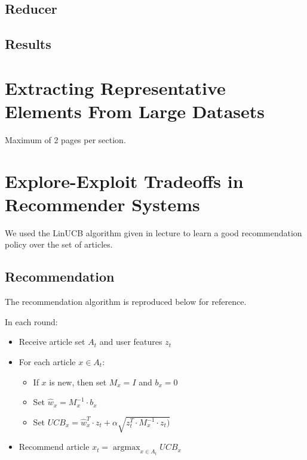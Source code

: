 \documentclass[a4paper, 11pt]{article}
\begin{document}
\subsection{Reducer}

\subsection{Results}
\pagebreak

\section{Extracting Representative Elements From Large Datasets}
Maximum of 2 pages per section.

\newpage

\section{Explore-Exploit Tradeoffs in Recommender Systems}

We used the LinUCB algorithm given in lecture to learn a good recommendation policy over the set of articles.

\subsection{Recommendation}

The recommendation algorithm is reproduced below for reference.
\newline

In each round:
\begin{itemize}

\item Receive article set $A_t$ and user features $z_t$
\item For each article $x \in A_t$:

\begin{itemize}

    \item If $x$ is new, then set $M_x = I$ and $b_x = 0$
    \item Set $\hat{w}_x = M_x^{-1} \cdot b_x$
    \item Set $UCB_x = \hat{w}_x^T \cdot z_t + \alpha \sqrt{z_t^T \cdot M_x^{-1} \cdot z_t)}$

\end{itemize}
        
\item Recommend article $x_t = 
    \operatorname{argmax}_{x \in A_t} UCB_x$
        
\end {itemize}
\end{document}
